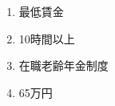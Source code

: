 \begin{answerbox}
  \begin{enumerate}[A: ]
    \item 最低賃金
    \item 10時間以上
    \item 在職老齢年金制度
    \item 65万円
  \end{enumerate}
\end{answerbox}

